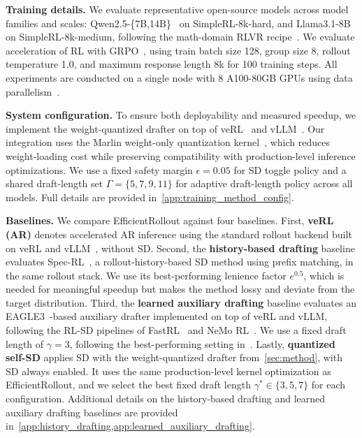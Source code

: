 \documentclass{llmxive}
\providecommand{\methodtitle}{EfficientRollout}
\providecommand{\nosd}{veRL (AR)}
\providecommand{\alwayssd}{quantized self-SD}
\providecommand{\history}{history-based drafting}
\providecommand{\learned}{learned auxiliary drafting}
\providecommand{\DraftLength}{\gamma}
\providecommand{\togglepolicy}{SD toggle policy}
\providecommand{\adaptivepolicy}{adaptive draft-length policy}
\begin{document}
\textbf{Training details.}
We evaluate representative open-source models across model families and scales: Qwen2.5-\{7B,14B\}~\citep{Yang2024Qwen25TR} on SimpleRL-8k-hard, and Llama3.1-8B~\citep{grattafiori2024llama} on SimpleRL-8k-medium, following the math-domain RLVR recipe~\citep{zeng2025simplerl}.
We evaluate acceleration of RL with GRPO~\citep{shao2024deepseekmath}, using train batch size 128, group size 8, rollout temperature 1.0, and maximum response length 8k for 100 training steps.
All experiments are conducted on a single node with 8 A100-80GB GPUs using data parallelism~\citep{shao2025beat}.

\textbf{System configuration.}
To ensure both deployability and measured speedup, we implement the weight-quantized drafter on top of veRL~\citep{sheng2025hybridflow} and vLLM~\citep{kwon2023efficient}.
Our integration uses the Marlin weight-only quantization kernel~\citep{frantar2025marlin}, which reduces weight-loading cost while preserving compatibility with production-level inference optimizations.
We use a fixed safety margin $\epsilon=0.05$ for \togglepolicy{} and a shared draft-length set $\Gamma=\{5,7,9,11\}$ for \adaptivepolicy{} across all models. Full details are provided in~\cref{app:training_method_config}.

\textbf{Baselines.}
We compare \methodtitle{} against four baselines.
First, \textbf{\nosd{}} denotes accelerated AR inference using the standard rollout backend built on veRL and vLLM~\citep{sheng2025hybridflow,kwon2023efficient}, without SD.
Second, the \textbf{\history{}} baseline evaluates Spec-RL~\citep{liu2025spec}, a rollout-history-based SD method using prefix matching, in the same rollout stack.
We use its best-performing lenience factor $e^{0.5}$, which is needed for meaningful speedup but makes the method lossy and deviate from the target distribution.
Third, the \textbf{\learned{}} baseline evaluates an EAGLE3~\citep{li2025eagle}-based auxiliary drafter implemented on top of veRL and vLLM, following the RL-SD pipelines of FastRL~\citep{hu2026taming} and NeMo RL~\citep{iso2026accelerating}.
We use a fixed draft length of $\DraftLength=3$, following the best-performing setting in~\citet{iso2026accelerating}.
Lastly, \textbf{\alwayssd{}} applies SD with the weight-quantized drafter from~\cref{sec:method}, with SD always enabled.
It uses the same production-level kernel optimization as \methodtitle{}, and we select the best fixed draft length $\DraftLength^{*} \in \{3,5,7\}$ for each configuration.
Additional details on the \history{} and \learned{} baselines are provided in~\cref{app:history_drafting,app:learned_auxiliary_drafting}.
\end{document}
